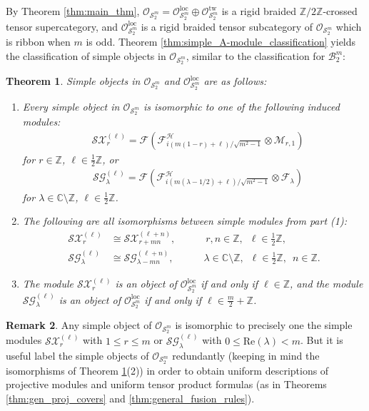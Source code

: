 \documentclass[11pt, reqno]{amsart}
\newtheorem{thm}{Theorem}[section]
\theoremstyle{definition}\newtheorem{defi}[thm]{Definition}
\theoremstyle{definition}\newtheorem{rem}[thm]{Remark}
\theoremstyle{definition}\newtheorem{exam}[thm]{Example}
\theoremstyle{definition}\newtheorem{assum}[thm]{Assumption}
\newcommand{\cB}{\mathcal{B}}
\newcommand{\cH}{\mathcal{H}}
\newcommand{\cM}{\mathcal{M}}
\newcommand{\cS}{\mathcal{S}}
\newcommand{\cX}{\mathcal{X}}
\newcommand{\cF}{\mathcal{F}}
\newcommand{\cO}{\mathcal{O}}
\newcommand{\cG}{\mathcal{G}}
\newcommand{\CC}{\mathbb{C}}
\newcommand{\ZZ}{\mathbb{Z}}
\newcommand{\Oloc}{\cO^{\mathrm{loc}}}
\newcommand{\Otw}{\cO^{\mathrm{tw}}}
\begin{document}
By Theorem \ref{thm:main_thm}, $\cO_{\cS_2^m}=\Oloc_{\cS_2^m}\oplus\Otw_{\cS_2^m}$ is a rigid braided $\ZZ/2\ZZ$-crossed tensor supercategory, and $\Oloc_{\cS_2^m}$ is a rigid braided tensor subcategory of $\cO_{\cS_2^m}$ which is ribbon when $m$ is odd. Theorem \ref{thm:simple_A-module_classification} yields the classification of simple objects in $\cO_{\cS_2^m}$, similar to the classification for $\cB_2^m$:



\begin{thm}\label{thm:S2m_mod_class}
Simple objects in $\cO_{\cS_2^m}$ and $\Oloc_{\cS_2^m}$ are as follows:
\begin{enumerate}
\item Every simple object in $\cO_{\cS_2^m}$ is isomorphic to one of the following induced modules:
 \begin{align*}
&  \cS\cX_{r}^{(\ell)} =\cF\left(\cF^\cH_{i(m(1-r)+\ell)/\sqrt{m^2-1}}\otimes\cM_{r,1}\right)
\end{align*}
for $r\in\ZZ$, $\ell\in\frac{1}{2}\ZZ$, or
\begin{align*}
& \cS\cG_{\lambda}^{(\ell)}=\cF\left(\cF^{\cH}_{i(m(\lambda-1/2)+\ell)/\sqrt{m^2-1}}\otimes\cF_{\lambda}\right)
 \end{align*}
for $\lambda\in\CC\setminus\ZZ$, $\ell\in\frac{1}{2}\ZZ$.

\item The following are  all isomorphisms between simple modules from part (1): 
\begin{align*}
\cS\cX_r^{(\ell)} & \cong \cS\cX_{r+mn}^{(\ell+n)},\qquad\quad r,n\in\ZZ, \,\,\, \ell\in\frac{1}{2}\ZZ,\\
\cS\cG^{(\ell)}_\lambda & \cong\cS\cG_{\lambda-mn}^{(\ell+n)}, \qquad\quad \lambda\in\CC\setminus \ZZ,\,\,\, \ell\in\frac{1}{2}\ZZ,\,\,\, n\in\ZZ.
\end{align*}



\item The module $\cS\cX_r^{(\ell)}$ is an object of $\Oloc_{\cS_2^m}$ if and only if $\ell\in\ZZ$, and the module $\cS\cG_\lambda^{(\ell)}$ is an object of $\Oloc_{\cS_2^m}$ if and only if $\ell\in\frac{m}{2}+\ZZ$.
\end{enumerate}


\end{thm}

\begin{rem}
Any simple object of $\cO_{\cS_2^m}$ is isomorphic to precisely one the simple modules $\cS\cX_r^{(\ell)}$ with $1\leq r\leq m$ or $\cS\cG_\lambda^{(\ell)}$ with $0\leq\mathrm{Re}(\lambda)<m$. But it is useful label the simple objects of $\cO_{\cS_2^m}$ redundantly (keeping in mind the isomorphisms of Theorem \ref{thm:S2m_mod_class}(2)) in order to obtain uniform descriptions of projective modules and uniform tensor product formulas (as in Theorems \ref{thm:gen_proj_covers} and \ref{thm:general_fusion_rules}).
\end{rem}
\end{document}
